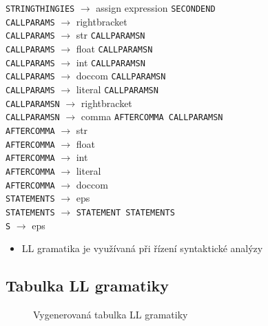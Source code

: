 \documentclass[a4paper, 11pt]{article}
\begin{document}
    \verb|STRINGTHINGIES| $\rightarrow$ assign expression \verb|SECONDEND|    \\
    \verb|CALLPARAMS| $\rightarrow$ rightbracket   \\
    \verb|CALLPARAMS| $\rightarrow$ str \verb|CALLPARAMSN|    \\
    \verb|CALLPARAMS| $\rightarrow$ float \verb|CALLPARAMSN|  \\
    \verb|CALLPARAMS| $\rightarrow$ int \verb|CALLPARAMSN|    \\
    \verb|CALLPARAMS| $\rightarrow$ doccom \verb|CALLPARAMSN| \\
    \verb|CALLPARAMS| $\rightarrow$ literal \verb|CALLPARAMSN|    \\
    \verb|CALLPARAMSN| $\rightarrow$ rightbracket  \\
    \verb|CALLPARAMSN| $\rightarrow$ comma \verb|AFTERCOMMA CALLPARAMSN|  \\
    \verb|AFTERCOMMA| $\rightarrow$ str    \\
    \verb|AFTERCOMMA| $\rightarrow$ float  \\
    \verb|AFTERCOMMA| $\rightarrow$ int    \\
    \verb|AFTERCOMMA| $\rightarrow$ literal    \\
    \verb|AFTERCOMMA| $\rightarrow$ doccom \\
 	\verb|STATEMENTS| $\rightarrow$ eps   \\
	\verb|STATEMENTS| $\rightarrow$ \verb|STATEMENT STATEMENTS|  \\
	\verb|S| $\rightarrow$ eps
	
	\begin{itemize}
        \item LL gramatika je využívaná při řízení syntaktické analýzy
    \end{itemize}
    
\newpage



\newpage
\begin{landscape}
\section{Tabulka LL gramatiky}
\begin{figure}[ht]
  \centering
   { }
\caption{Vygenerovaná tabulka LL gramatiky}\label{pic:3}
\end{figure}
\end{landscape}
\end{document}
